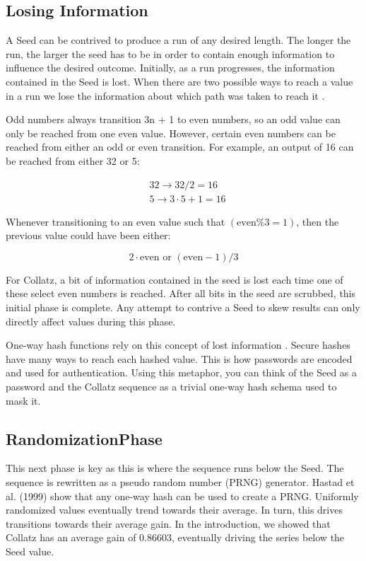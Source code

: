 \documentclass[letterpaper]{article}
\begin{document}
\begin{multicols}{2}
    \subsection{Losing Information}
    A Seed can be contrived to produce a run of any desired length. The longer the run, the larger the seed has to be in order to contain enough information to influence the desired outcome. Initially, as a run progresses, the information contained in the Seed is lost. When there are two possible ways to reach a value in a run we lose the information about which path was taken to reach it \cite{2}.

    Odd numbers always transition 3n + 1 to even numbers, so an odd value can only be reached from one even value. However, certain even numbers can be reached from either an odd or even transition. For example, an output of 16 can be reached from either 32 or 5:

    \[
        \begin{aligned}
             & 32 \rightarrow 32 / 2 = 16     \\
             & 5 \rightarrow 3\cdot5 + 1 = 16
        \end{aligned}
    \]

    Whenever transitioning to an even value such that $(\text{even} \% 3 = 1)$, then the previous value could have been either:

    \[
        2 \cdot \text{even or } (\text{even} - 1) / 3
    \]

    For Collatz, a bit of information contained in the seed is lost each time one of these select even numbers is reached. After all bits in the seed are scrubbed, this initial phase is complete. Any attempt to contrive a Seed to skew results can only directly affect values during this phase.

    One-way hash functions rely on this concept of lost information \cite{3}. Secure hashes have many ways to reach each hashed value. This is how passwords are encoded and used for authentication. Using this metaphor, you can think of the Seed as a password and the Collatz sequence as a trivial one-way hash schema used to mask it.

    \subsection{RandomizationPhase}

    This next phase is key as this is where the sequence runs below the Seed. The sequence is rewritten as a pseudo random number (PRNG) generator. Hastad et al. (1999) \cite{4} show that any one-way hash can be used to create a PRNG. Uniformly randomized values eventually trend towards their average. In turn, this drives transitions towards their average gain. In the introduction, we showed that Collatz has an average gain of $0.86603$, eventually driving the series below the Seed value.


\end{multicols}
\end{document}
